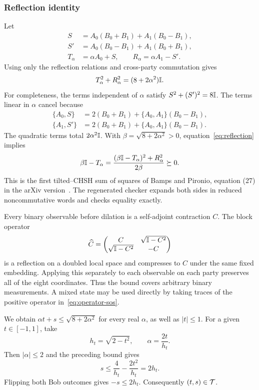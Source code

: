 \subsubsection{Reflection identity}
Let
\begin{align*}
 S&=A_0(B_0+B_1)+A_1(B_0-B_1),\\
 S'&=A_0(B_0-B_1)+A_1(B_0+B_1),\\
 T_\alpha&=\alpha A_0+S,\qquad R_\alpha=\alpha A_1-S'.
\end{align*}
Using only the reflection relations and cross-party commutation gives
\begin{equation}\label{eq:reflection}
 T_\alpha^2+R_\alpha^2=(8+2\alpha^2)\mathbb I.
\end{equation}
For completeness, the terms independent of $\alpha$ satisfy $S^2+(S')^2=8\mathbb I$. The terms linear in $\alpha$ cancel because
\begin{align*}
 \{A_0,S\}&=2(B_0+B_1)+\{A_0,A_1\}(B_0-B_1),\\
 \{A_1,S'\}&=2(B_0+B_1)+\{A_0,A_1\}(B_0-B_1).
\end{align*}
The quadratic terms total $2\alpha^2\mathbb I$.
With $\beta=\sqrt{8+2\alpha^2}>0$, equation~\eqref{eq:reflection} implies
\begin{equation}\label{eq:operator-sos}
 \beta\mathbb I-T_\alpha
 =\frac{(\beta\mathbb I-T_\alpha)^2+R_\alpha^2}{2\beta}\succeq0.
\end{equation}
This is the first tilted--CHSH sum of squares of Bamps and Pironio, equation (27) in the arXiv version~\cite{BP}. The regenerated checker expands both sides in reduced noncommutative words and checks equality exactly.

Every binary observable before dilation is a self-adjoint contraction $C$. The block operator
\[
 \widehat C=\begin{pmatrix}C&\sqrt{\mathbb I-C^2}\\
 \sqrt{\mathbb I-C^2}&-C\end{pmatrix}
\]
is a reflection on a doubled local space and compresses to $C$ under the same fixed embedding. Applying this separately to each observable on each party preserves all of the eight coordinates. Thus the bound covers arbitrary binary measurements. A mixed state may be used directly by taking traces of the positive operator in~\eqref{eq:operator-sos}.

We obtain $\alpha t+s\le\sqrt{8+2\alpha^2}$ for every real $\alpha$, as well as $|t|\le1$. For a given $t\in[-1,1]$, take
\[
 h_t=\sqrt{2-t^2},\qquad \alpha=\frac{2t}{h_t}.
\]
Then $|\alpha|\le2$ and the preceding bound gives
\[
 s\le\frac4{h_t}-\frac{2t^2}{h_t}=2h_t.
\]
Flipping both Bob outcomes gives $-s\le2h_t$. Consequently $(t,s)\in\mathcal T$.

